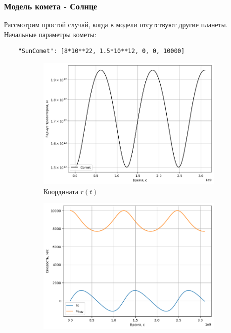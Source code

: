 \subsubsection*{Модель комета - Солнце}
Рассмотрим простой случай, когда в модели отсутствуют другие планеты. Начальные параметры кометы:
\begin{lstlisting}
	"SunComet": [8*10**22, 1.5*10**12, 0, 0, 10000]
\end{lstlisting}

\begin{figure}[H]
    \centering
    \begin{subfigure}{0.49\linewidth}
        \centering
		\includegraphics[width=1\linewidth]{imgs_8/rSunComet.png}
		\caption{Координата $r(t)$}
	\end{subfigure}
	\begin{subfigure}{0.49\linewidth}
        \centering
		\includegraphics[width=1\linewidth]{imgs_8/vSunComet.png}

\end{subfigure}
\end{figure}
